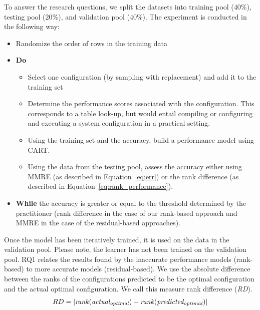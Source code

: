 \documentclass[sigconf]{acmart}
\DeclarePairedDelimiter\abs{\lvert}{\rvert}%
\begin{document}
To answer the research questions, we split the datasets into training pool (40\%), testing pool (20\%), and validation pool (40\%). The experiment is conducted in the following way:
\begin{itemize}
    \item Randomize the order of rows  in  the training data
    \item \textbf{Do}
    \begin{itemize}
        \item Select one configuration (by sampling with replacement) and add it to the training set
        \item Determine the performance scores associated with the configuration. This corresponds to  a table look-up, but would entail compiling or configuring and executing a system configuration in a practical setting.
        \item Using the training set and the accuracy, build a performance model using CART.
        \item Using the data from the testing pool, assess the accuracy either using MMRE (as described in Equation~\ref{eq:err}) or the rank difference (as described in Equation~\ref{eq:rank_performance}).         
    \end{itemize}
    \item \textbf{While} the accuracy is greater or equal to the threshold determined by the practitioner (rank difference in the case of our rank-based approach and MMRE in the case of the residual-based approaches).
\end{itemize}

Once the model has been iteratively trained, it is used on the data in the validation pool. Please note, the learner has not been trained on the validation pool.
RQ1 relates the results found by the inaccurate performance models (rank-based) to more accurate models (residual-based). We use the absolute difference between the ranks of the configurations predicted to be the optimal configuration and the actual optimal configuration. We call this measure rank difference (\textit{RD}).  
\begin{equation}\label{eq:rankdiff}
    \begin{split}
        RD &= \abs[Big]{\mathit{rank(actual_{optimal})} - \mathit{rank(predicted_{optimal})}}\\
    \end{split}
\end{equation}
\end{document}

